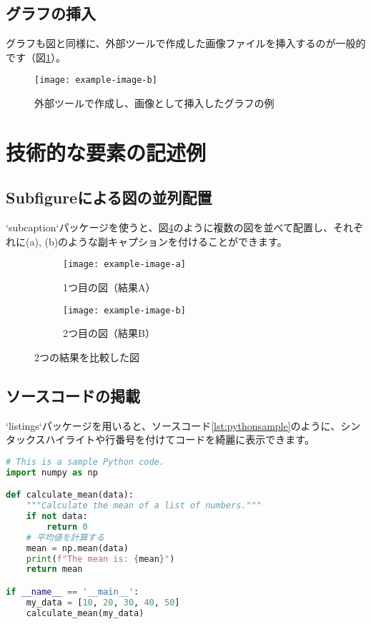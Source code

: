 \subsection{グラフの挿入}
グラフも図と同様に、外部ツールで作成した画像ファイルを挿入するのが一般的です（図\ref{fig:graph-image}）。

\begin{figure}[htbp]
  \centering
  \texttt{[image: example-image-b]}
  \caption{外部ツールで作成し、画像として挿入したグラフの例}
  \label{fig:graph-image}
\end{figure}




\section{技術的な要素の記述例}

\subsection{Subfigureによる図の並列配置}
`subcaption`パッケージを使うと、図\ref{fig:subfigures}のように複数の図を並べて配置し、それぞれに(a), (b)のような副キャプションを付けることができます。

\begin{figure}[htbp]
  \centering
  \begin{subfigure}[b]{0.48\textwidth}
    \centering
    \texttt{[image: example-image-a]}
    \caption{1つ目の図（結果A）}
    \label{fig:sub-a}
  \end{subfigure}
  \hfill %
  \begin{subfigure}[b]{0.48\textwidth}
    \centering
    \texttt{[image: example-image-b]}
    \caption{2つ目の図（結果B）}
    \label{fig:sub-b}
  \end{subfigure}
  \caption{2つの結果を比較した図}
  \label{fig:subfigures}
\end{figure}

\subsection{ソースコードの掲載}
`listings`パッケージを用いると、ソースコード\ref{lst:pythonsample}のように、シンタックスハイライトや行番号を付けてコードを綺麗に表示できます。

\begin{lstlisting}[language=Python, caption={Pythonによる簡単なサンプルコード}, label={lst:pythonsample}]
# This is a sample Python code.
import numpy as np

def calculate_mean(data):
    """Calculate the mean of a list of numbers."""
    if not data:
        return 0
    # 平均値を計算する
    mean = np.mean(data)
    print(f"The mean is: {mean}")
    return mean

if __name__ == '__main__':
    my_data = [10, 20, 30, 40, 50]
    calculate_mean(my_data)
\end{lstlisting}

